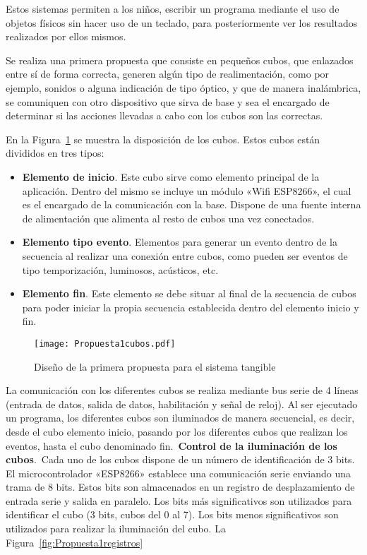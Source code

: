 Estos sistemas permiten a los niños, escribir un programa mediante el uso de objetos físicos sin hacer uso de un teclado, para posteriormente ver los resultados realizados por ellos mismos.

Se realiza una primera propuesta que consiste en pequeños cubos, que enlazados entre sí de forma correcta, generen algún tipo de realimentación, como por ejemplo, sonidos o alguna indicación de tipo óptico, y que de manera inalámbrica, se comuniquen con otro dispositivo que sirva de base y sea el encargado de determinar si las acciones llevadas a cabo con los cubos son las correctas.

En la Figura~\ref{fig:Propuesta1cubos} se muestra la disposición de los cubos. Estos cubos están divididos en tres tipos:

\begin{itemize}
\item \textbf{Elemento de inicio}. Este cubo sirve como elemento principal de la aplicación. Dentro del mismo se incluye un módulo «Wifi ESP8266», el cual es el encargado de la comunicación con la base. Dispone de una fuente interna de alimentación que alimenta al resto de cubos una vez conectados.
\item \textbf{Elemento tipo evento}. Elementos para generar un evento dentro de la secuencia al realizar una conexión entre cubos, como pueden ser eventos de tipo temporización, luminosos, acústicos, etc.
\item \textbf{Elemento fin}. Este elemento se debe situar al final de la secuencia de cubos para poder iniciar la propia secuencia establecida dentro del elemento inicio y fin. 
\end{itemize}

\begin{figure}[!h]
\begin{center}
\texttt{[image: Propuesta1cubos.pdf]}
\caption{Diseño de la primera propuesta para el sistema tangible}
\label{fig:Propuesta1cubos}
\end{center}
\end{figure}

La comunicación con los diferentes cubos se realiza mediante bus serie de 4 líneas (entrada de datos, salida de datos, habilitación y señal de reloj).
Al ser ejecutado un programa, los diferentes cubos son iluminados de manera secuencial, es decir, desde el cubo elemento inicio, pasando por los diferentes cubos que realizan los eventos, hasta el cubo denominado fin.\
\textbf{Control de la iluminación de los cubos}.\
Cada uno de los cubos dispone de un número de identificación de 3 bits. El microcontrolador «ESP8266» establece una comunicación serie enviando una trama de 8 bits. Estos bits son almacenados en un registro de desplazamiento de entrada serie y salida en paralelo. Los bits más significativos son utilizados para identificar el cubo (3 bits, cubos del 0 al 7). Los bits menos significativos son utilizados para realizar la iluminación del cubo. La Figura~\ref{fig:Propuesta1registros}

